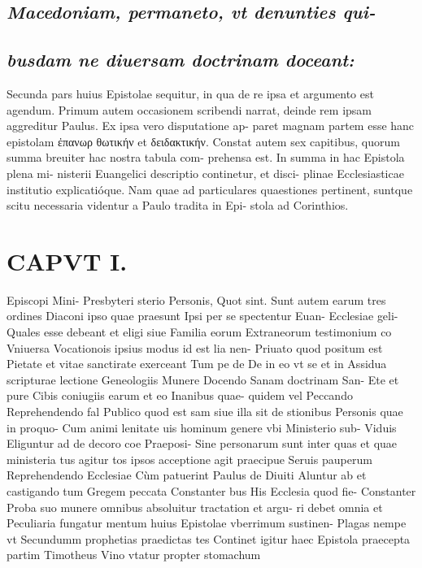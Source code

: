 \documentclass{article}
\begin{document}
\begin{pages}
\subsection*{\textit{Macedoniam, permaneto, vt denunties qui-}} 
{}
\subsection*{\textit{busdam ne diuersam doctrinam doceant:}} Secunda pars huius Epistolae sequitur, in qua de re ipsa et argumento est agendum. Primum autem occasionem scribendi narrat, deinde rem ipsam aggreditur Paulus. Ex ipsa vero disputatione ap- paret magnam partem esse hanc epistolam ἐπανωρ θωτικήν et δειδακτικήν. Constat autem sex capitibus, quorum summa breuiter hac nostra tabula com- prehensa est. In summa in hac Epistola plena mi- nisterii Euangelici descriptio continetur, et disci- plinae Ecclesiasticae institutio explicatióque. Nam quae ad particulares quaestiones pertinent, suntque scitu necessaria videntur a Paulo tradita in Epi- stola ad Corinthios. 
\section*{CAPVT  I. }
\marginpar{[ p.7 ]}Episcopi Mini- Presbyteri sterio Personis, Quot sint. Sunt autem earum tres ordines { Diaconi ipso quae praesunt Ipsi per se spectentur Euan- Ecclesiae { geli- Quales esse debeant et eligi siue Familia eorum Extraneorum testimonium co Vniuersa { Vocationois ipsius modus id est lia nen- Priuato quod positum est { Pietate et vitae sanctirate exerceant Tum pe de De in eo vt se et in Assidua scripturae lectione { Geneologiis Munere Docendo Sanam doctrinam San- Ete et pure Cibis coniugiis earum et eo Inanibus quae- quidem vel Peccando Reprehendendo fal { Publico quod est { sam siue illa sit de { stionibus Personis quae { in proquo- Cum animi lenitate uis hominum genere vbi Ministerio sub- Viduis Eliguntur ad de decoro coe Praeposi- Sine personarum sunt inter quas et quae ministeria tus agitur tos ipsos acceptione agit praecipue Seruis pauperum { { Reprehendendo Ecclesiae Cùm patuerint Paulus de Diuiti { Aluntur ab et castigando tum Gregem peccata { Constanter bus His Ecclesia { quod fie- Constanter Proba suo munere omnibus absoluitur tractation et argu- ri debet omnia et Peculiaria { fungatur { mentum huius Epistolae vberrimum sustinen- Plagas nempe vt { Secundumm prophetias praedictas tes Continet igitur haec Epistola praecepta partim Timotheus { Vino vtatur propter stomachum { 
}}}}}}}}}}}}}}}}}}}
\end{pages}
\end{document}
